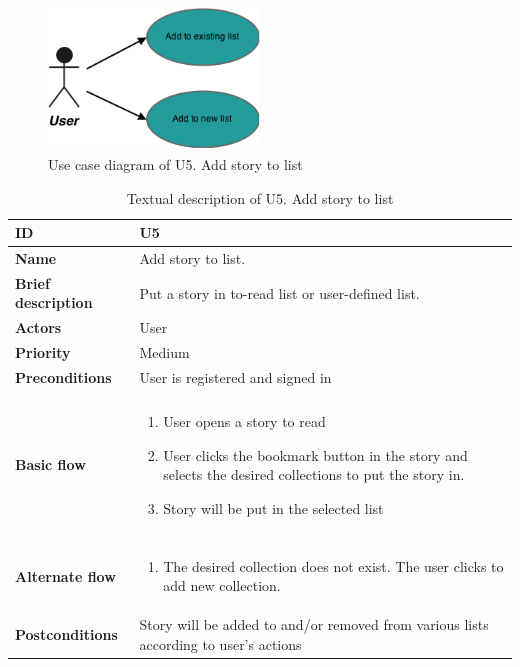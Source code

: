 \begin{figure}[hp]
	\includegraphics[width=0.5\textwidth]{fig/U5}
	\centering
	\caption{Use case diagram of U5. Add story to list}
	\label{Fig:U5}
\end{figure}

\begin{table}[hp]
	\renewcommand{\arraystretch}{1.5}
	\centering
	\caption{Textual description of U5. Add story to list}
	\begin{tabular}[b]{| p{3.5cm} | p{13cm}|}\hline
		\textbf{ID} 				& U5									\\\hline
		\textbf{Name} 				& Add story to list.					\\\hline
		\textbf{Brief description}	& Put a story in to-read list or user-defined  list. 		\\\hline
		\textbf{Actors} 			& User									\\\hline
		\textbf{Priority}			& Medium								\\\hline
		\textbf{Preconditions}		& User is registered and signed in		\\\hline&\\[-2ex]
		\textbf{Basic flow}			& \begin{minipage}{5in}
			\begin{enumerate}[noitemsep]
				\item User opens a story to read
				\item User clicks the bookmark button in the story and selects the desired collections to put the story in.
				\item Story will be put in the selected list
			\end{enumerate}						
		\end{minipage}						\\\hline&\\[-2ex]
		\textbf{Alternate flow}		& \begin{minipage}{5in}
			\begin{enumerate}[noitemsep]
				\item The desired collection does not exist. The user clicks to add new collection.
			\end{enumerate}
		\end{minipage}							\\\hline
		\textbf{Postconditions}		& Story will be added to and/or removed from various lists according to user's actions\\\hline
	\end{tabular}
	\label{Tab:U5}
\end{table}

